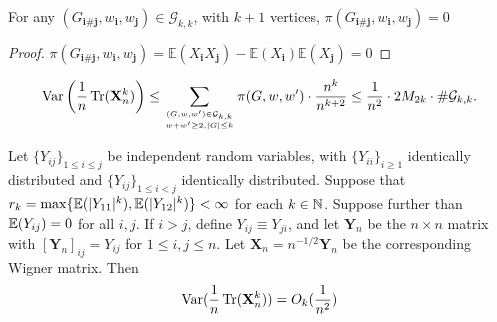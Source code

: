 \begin{lemma}
    \label{lem:G_leq_k}
    \notready
    For any $(G_{\mathbf{i}\#\mathbf{j}},w_\mathbf{i},w_\mathbf{j}) \in \mathcal{G}_{k,k}$, with $k + 1$ vertices, $\pi(G_{\mathbf{i}\#\mathbf{j}},w_\mathbf{i},w_\mathbf{j})  = 0$ 
    \begin{proof}
     $\pi(G_{\mathbf{i}\#\mathbf{j}},w_\mathbf{i},w_\mathbf{j}) = \mathbb{E}(X_{\mathbf{i}}X_{\mathbf{j}}) - \mathbb{E}(X_{\mathbf{i}})\mathbb{E}(X_{\mathbf{j}})  = 0$
    \end{proof}
\end{lemma}


\begin{lemma}
    \label{lem:elimination_kp1}
    \notready

    \[ \operatorname{Var}\left( \frac1n\operatorname{Tr}(\mathbf{X}_n^k)\right) \le \sum_{(G,w,w')\in\mathcal{G}_{k,k}\atop w+w'\ge 2, |G| \leq k} \pi(G,w,w')\cdot \frac{n^{k}}{n^{k+2}} \le \frac{1}{n^2}\cdot 2M_{2k}\cdot \#\mathcal{G}_{k,k}. \]
\end{lemma}




\begin{proposition}
  \label{prop:matrix_moments_convergence_probability}
  \notready
  Let $\{Y_{ij}\}_{1 \leq i \leq j}$ be independent random variables, with $\{Y_{ii}\}_{i\geq 1}$ identically distributed and $\{Y_{ij}\}_{1 \leq i < j}$ identically distributed. Suppose that $r_k = \max\{\mathbb{E}(|Y_{11}|^k),\mathbb{E}(|Y_{12}|^k)\} < \infty$ for each $k\in\mathbb{N}$. Suppose further than $\mathbb{E}(Y_{ij})=0$ for all $i,j$. If $i>j$, define $Y_{ij} \equiv Y_{ji}$, and let $\mathbf{Y}_n$ be the $n\times n$ matrix with $[\mathbf{Y}_n]_{ij} = Y_{ij}$ for $1\le i,j\le n$. Let $\mathbf{X}_n = n^{-1/2}\mathbf{Y}_n$ be the corresponding Wigner matrix. Then
  $$
  \operatorname{Var}(\frac{1}{n}\operatorname{Tr}(\mathbf{X}_{n}^{k})) = O_{k}(\frac{1}{n^2})
  $$ 
\end{proposition}
